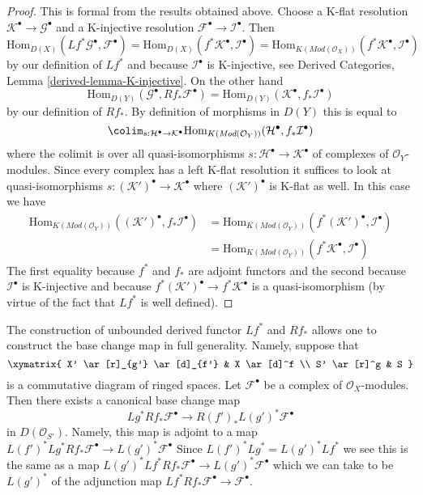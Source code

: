 \begin{proof}
This is formal from the results obtained above.
Choose a K-flat resolution $\mathcal{K}^\bullet \to \mathcal{G}^\bullet$
and a K-injective resolution $\mathcal{F}^\bullet \to \mathcal{I}^\bullet$.
Then
$$
\text{Hom}_{D(X)}(Lf^*\mathcal{G}^\bullet, \mathcal{F}^\bullet) =
\text{Hom}_{D(X)}(f^*\mathcal{K}^\bullet, \mathcal{I}^\bullet) =
\text{Hom}_{K(\textit{Mod}(\mathcal{O}_X))}(f^*\mathcal{K}^\bullet,
\mathcal{I}^\bullet)
$$
by our definition of $Lf^*$ and because $\mathcal{I}^\bullet$ is K-injective,
see Derived Categories, Lemma \ref{derived-lemma-K-injective}.
On the other hand
$$
\text{Hom}_{D(Y)}(\mathcal{G}^\bullet, Rf_*\mathcal{F}^\bullet) =
\text{Hom}_{D(Y)}(\mathcal{K}^\bullet, f_*\mathcal{I}^\bullet)
$$
by our definition of $Rf_*$. By definition of morphisms in $D(Y)$
this is equal to
$$
\colim_{s : \mathcal{H}^\bullet \to \mathcal{K}^\bullet}
\text{Hom}_{K(\textit{Mod}(\mathcal{O}_Y))}(\mathcal{H}^\bullet,
f_*\mathcal{I}^\bullet)
$$
where the colimit is over all quasi-isomorphisms
$s : \mathcal{H}^\bullet \to \mathcal{K}^\bullet$
of complexes of $\mathcal{O}_Y$-modules.
Since every complex has a left K-flat resolution
it suffices to look at quasi-isomorphisms
$s : (\mathcal{K}')^\bullet \to \mathcal{K}^\bullet$
where $(\mathcal{K}')^\bullet$ is K-flat as well.
In this case we have
\begin{align*}
\text{Hom}_{K(\textit{Mod}(\mathcal{O}_Y))}((\mathcal{K}')^\bullet,
f_*\mathcal{I}^\bullet)
& =
\text{Hom}_{K(\textit{Mod}(\mathcal{O}_Y))}(f^*(\mathcal{K}')^\bullet,
\mathcal{I}^\bullet) \\
& =
\text{Hom}_{K(\textit{Mod}(\mathcal{O}_Y))}(f^*\mathcal{K}^\bullet,
\mathcal{I}^\bullet)
\end{align*}
The first equality because $f^*$ and $f_*$ are adjoint functors and
the second because $\mathcal{I}^\bullet$ is K-injective and
because $f^*(\mathcal{K}')^\bullet \to f^*\mathcal{K}^\bullet$
is a quasi-isomorphism (by virtue of the fact that $Lf^*$ is well
defined).
\end{proof}

\begin{remark}
\label{remark-base-change}
The construction of unbounded derived functor $Lf^*$ and $Rf_*$
allows one to construct the base change map in full generality.
Namely, suppose that
$$
\xymatrix{
X' \ar[r]_{g'} \ar[d]_{f'} &
X \ar[d]^f \\
S' \ar[r]^g &
S
}
$$
is a commutative diagram of ringed spaces. Let $\mathcal{F}^\bullet$ be a
complex of $\mathcal{O}_X$-modules. Then there exists a canonical base change
map
$$
Lg^*Rf_*\mathcal{F}^\bullet
\longrightarrow
R(f')_*L(g')^*\mathcal{F}^\bullet
$$
in $D(\mathcal{O}_{S'})$. Namely, this map is adjoint to a map
$
L(f')^*Lg^*Rf_*\mathcal{F}^\bullet
\to
L(g')^*\mathcal{F}^\bullet
$
Since $L(f')^*Lg^* = L(g')^*Lf^*$ we see this is the same as a map
$
L(g')^*Lf^*Rf_*\mathcal{F}^\bullet
\to
L(g')^*\mathcal{F}^\bullet
$
which we can take to be $L(g')^*$ of the adjunction map
$Lf^*Rf_*\mathcal{F}^\bullet \to \mathcal{F}^\bullet$.
\end{remark}




